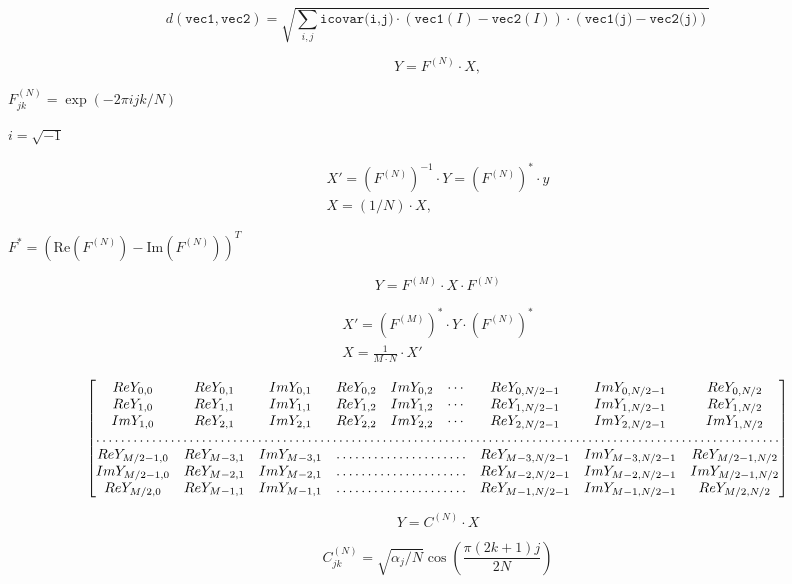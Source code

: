 \documentclass{article}
\begin{document}
\[d( \texttt{vec1} , \texttt{vec2} )= \sqrt{\sum_{i,j}{\texttt{icovar(i,j)}\cdot(\texttt{vec1}(I)-\texttt{vec2}(I))\cdot(\texttt{vec1(j)}-\texttt{vec2(j)})} }\]
\pagebreak

\[Y = F^{(N)} \cdot X,\]
\pagebreak

$F^{(N)}_{jk}=\exp(-2\pi i j k/N)$
\pagebreak

$i=\sqrt{-1}$
\pagebreak

\[\begin{array}{l} X'= \left (F^{(N)} \right )^{-1} \cdot Y = \left (F^{(N)} \right )^* \cdot y \\ X = (1/N) \cdot X, \end{array}\]
\pagebreak

$F^*=\left(\textrm{Re}(F^{(N)})-\textrm{Im}(F^{(N)})\right)^T$
\pagebreak

\[Y = F^{(M)} \cdot X \cdot F^{(N)}\]
\pagebreak

\[\begin{array}{l} X'= \left (F^{(M)} \right )^* \cdot Y \cdot \left (F^{(N)} \right )^* \\ X = \frac{1}{M \cdot N} \cdot X' \end{array}\]
\pagebreak

\[\begin{bmatrix} Re Y_{0,0} & Re Y_{0,1} & Im Y_{0,1} & Re Y_{0,2} & Im Y_{0,2} & \cdots & Re Y_{0,N/2-1} & Im Y_{0,N/2-1} & Re Y_{0,N/2} \\ Re Y_{1,0} & Re Y_{1,1} & Im Y_{1,1} & Re Y_{1,2} & Im Y_{1,2} & \cdots & Re Y_{1,N/2-1} & Im Y_{1,N/2-1} & Re Y_{1,N/2} \\ Im Y_{1,0} & Re Y_{2,1} & Im Y_{2,1} & Re Y_{2,2} & Im Y_{2,2} & \cdots & Re Y_{2,N/2-1} & Im Y_{2,N/2-1} & Im Y_{1,N/2} \\ \hdotsfor{9} \\ Re Y_{M/2-1,0} & Re Y_{M-3,1} & Im Y_{M-3,1} & \hdotsfor{3} & Re Y_{M-3,N/2-1} & Im Y_{M-3,N/2-1}& Re Y_{M/2-1,N/2} \\ Im Y_{M/2-1,0} & Re Y_{M-2,1} & Im Y_{M-2,1} & \hdotsfor{3} & Re Y_{M-2,N/2-1} & Im Y_{M-2,N/2-1}& Im Y_{M/2-1,N/2} \\ Re Y_{M/2,0} & Re Y_{M-1,1} & Im Y_{M-1,1} & \hdotsfor{3} & Re Y_{M-1,N/2-1} & Im Y_{M-1,N/2-1}& Re Y_{M/2,N/2} \end{bmatrix}\]
\pagebreak

\[Y = C^{(N)} \cdot X\]
\pagebreak

\[C^{(N)}_{jk}= \sqrt{\alpha_j/N} \cos \left ( \frac{\pi(2k+1)j}{2N} \right )\]
\pagebreak
\end{document}
